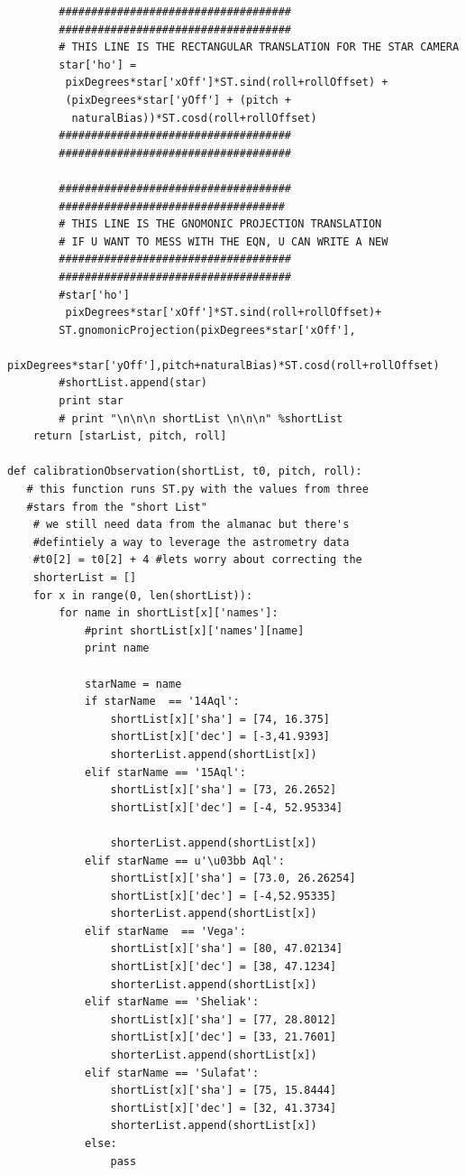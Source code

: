 \documentclass[12pt,a4paper]{book}
\begin{document}
\begin{appendices}
\begin{verbatim}
        ####################################
        ####################################
        # THIS LINE IS THE RECTANGULAR TRANSLATION FOR THE STAR CAMERA
        star['ho'] =
         pixDegrees*star['xOff']*ST.sind(roll+rollOffset) +
         (pixDegrees*star['yOff'] + (pitch +
          naturalBias))*ST.cosd(roll+rollOffset) 
        ####################################
        ####################################

        ####################################
        ###################################
        # THIS LINE IS THE GNOMONIC PROJECTION TRANSLATION 
        # IF U WANT TO MESS WITH THE EQN, U CAN WRITE A NEW 
        ####################################
        ####################################
        #star['ho'] 
         pixDegrees*star['xOff']*ST.sind(roll+rollOffset)+ 
        ST.gnomonicProjection(pixDegrees*star['xOff'],
        pixDegrees*star['yOff'],pitch+naturalBias)*ST.cosd(roll+rollOffset)  
        #shortList.append(star)
        print star 
        # print "\n\n\n shortList \n\n\n" %shortList
    return [starList, pitch, roll]

def calibrationObservation(shortList, t0, pitch, roll):
   # this function runs ST.py with the values from three 
   #stars from the "short List"
    # we still need data from the almanac but there's 
    #defintiely a way to leverage the astrometry data
    #t0[2] = t0[2] + 4 #lets worry about correcting the 
    shorterList = []
    for x in range(0, len(shortList)):
        for name in shortList[x]['names']:
            #print shortList[x]['names'][name]
            print name

            starName = name 
            if starName  == '14Aql':
                shortList[x]['sha'] = [74, 16.375]
                shortList[x]['dec'] = [-3,41.9393] 
                shorterList.append(shortList[x])
            elif starName == '15Aql':
                shortList[x]['sha'] = [73, 26.2652]
                shortList[x]['dec'] = [-4, 52.95334] 
               
                shorterList.append(shortList[x])
            elif starName == u'\u03bb Aql':
                shortList[x]['sha'] = [73.0, 26.26254]
                shortList[x]['dec'] = [-4,52.95335] 
                shorterList.append(shortList[x])
            elif starName  == 'Vega':
                shortList[x]['sha'] = [80, 47.02134]
                shortList[x]['dec'] = [38, 47.1234] 
                shorterList.append(shortList[x])
            elif starName == 'Sheliak':
                shortList[x]['sha'] = [77, 28.8012]
                shortList[x]['dec'] = [33, 21.7601] 
                shorterList.append(shortList[x])
            elif starName == 'Sulafat':
                shortList[x]['sha'] = [75, 15.8444]
                shortList[x]['dec'] = [32, 41.3734] 
                shorterList.append(shortList[x])
            else:
                pass


\end{verbatim}
\end{appendices}
\end{document}
